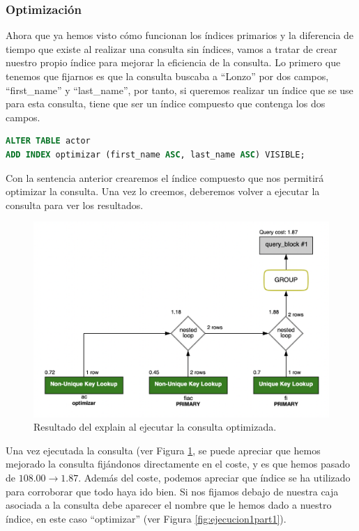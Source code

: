 \documentclass{db-practice}
\begin{document}
\subsubsection*{Optimización}

Ahora que ya hemos visto cómo funcionan los índices primarios y la diferencia de tiempo que existe al realizar una consulta sin índices, vamos a tratar de crear nuestro propio índice para mejorar la eficiencia de la consulta. Lo primero que tenemos que fijarnos es que la consulta buscaba a ``Lonzo'' por dos campos, ``first\_name'' y ``last\_name'', por tanto, si queremos realizar un índice que se use para esta consulta, tiene que ser un índice compuesto que contenga los dos campos.

\begin{lstlisting}[language=SQL]
ALTER TABLE actor
ADD INDEX optimizar (first_name ASC, last_name ASC) VISIBLE;
\end{lstlisting}

Con la sentencia anterior crearemos el índice compuesto que nos permitirá optimizar la consulta. Una vez lo creemos, deberemos volver a ejecutar la consulta para ver los resultados.

\begin{figure}[ht]
    \centering
    \includegraphics[width=0.8\columnwidth]{figs/ejecucion1optimizada.png}
    \caption{Resultado del explain al ejecutar la consulta optimizada.}\label{fig:ejecucion1optimizada}
\end{figure}

Una vez ejecutada la consulta (ver Figura \ref{fig:ejecucion1optimizada}, se puede apreciar que hemos mejorado la consulta fijándonos directamente en el coste, y es que hemos pasado de $108.00 \rightarrow 1.87$. Además del coste, podemos apreciar que índice se ha utilizado para corroborar que todo haya ido bien. Si nos fijamos debajo de nuestra caja asociada a la consulta debe aparecer el nombre que le hemos dado a nuestro índice, en este caso ``optimizar'' (ver Figura \ref{fig:ejecucion1part1}).
\end{document}

